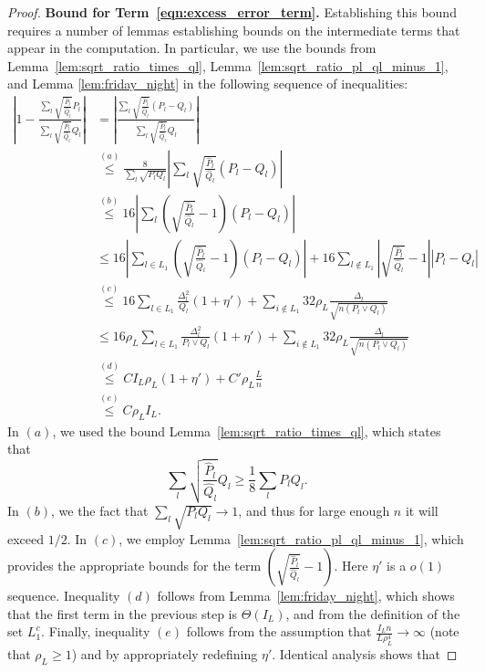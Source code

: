 \documentclass{article}
\begin{document}
\begin{proof}
\noindent \textbf{Bound for Term~\ref{eqn:excess_error_term}.} 
Establishing this bound requires a number of lemmas establishing bounds on the intermediate terms that appear in the computation. In particular, we use the bounds from Lemma~\ref{lem:sqrt_ratio_times_ql}, Lemma~\ref{lem:sqrt_ratio_pl_ql_minus_1}, and Lemma \ref{lem:friday_night} in the following sequence of inequalities:
\begin{align*}
\left| 1 -  \frac{\sum_l \sqrt{\frac{\hat{P}_l}{\hat{Q}_l} } P_l}
                {\sum_l \sqrt{\frac{\hat{P}_l}{\hat{Q}_l} } Q_l}  \right|
 &= \left| \frac{ \sum_l \sqrt{ \frac{\hat{P}_l}{\hat{Q}_l}} (P_l - Q_l) }
     { \sum_l \sqrt{ \frac{\hat{P}_l}{\hat{Q}_l}} Q_l } \right| \\
&\stackrel{(a)}\leq \frac{8}{\sum_l \sqrt{P_l Q_l}} 
     \left| \sum_l \sqrt{ \frac{\hat{P}_l}{\hat{Q}_l} }(P_l - Q_l) \right| \\
&\stackrel{(b)}\leq 16 \left|  \sum_{l} \left( \sqrt{ \frac{\hat{P}_l}{\hat{Q}_l} } - 1 \right) (P_l - Q_l)  \right| \\
&\leq 16 \left| 
     \sum_{l \in L_1} \left( \sqrt{\frac{\hat{P}_l}{\hat{Q}_l}} - 1 \right)(P_l - Q_l) 
     \right| + 16 \sum_{l \notin L_1} \left| \sqrt{ \frac{\hat{P}_l}{\hat{Q}_l}} - 1 \right| |P_l - Q_l| \\
&\stackrel{(c)}\leq 16 \sum_{l \in L_1} \frac{\Delta^2_l}{Q_l}(1+ \eta') + 
      \sum_{i \notin L_1} 32 \rho_L \frac{\Delta_l}{\sqrt{n (P_l \vee Q_l)}} \\
%
&\leq 16 \rho_L \sum_{l \in L_1} \frac{\Delta^2_l}{P_l \vee Q_l} (1+ \eta') + 
      \sum_{i \notin L_1} 32 \rho_L \frac{\Delta_l}{\sqrt{n (P_l \vee Q_l)}} \\
&\stackrel{(d)}\leq C I_L  \rho_L(1 + \eta') + C' \rho_L \frac{L}{n} \\
&\stackrel{(e)} \leq C \rho_L I_L. 
\end{align*}
In $(a)$, we used the bound Lemma~\ref{lem:sqrt_ratio_times_ql}, which states that
$$\sum_l \sqrt{\frac{\hat{P}_l}{\hat{Q}_l} } Q_l \geq \frac{1}{8} \sum_l P_lQ_l.$$ 
In $(b)$, we the fact that $\sum_l  \sqrt{P_l Q_l}  \to 1$, and thus for large enough $n$ it will exceed $1/2$. In $(c)$, we employ Lemma~\ref{lem:sqrt_ratio_pl_ql_minus_1}, which provides the appropriate bounds for the term $\left( \sqrt{\frac{\hat{P}_l}{\hat{Q}_l}} - 1 \right)$. Here $\eta'$ is a $o(1)$ sequence. Inequality $(d)$ follows from Lemma~\ref{lem:friday_night}, which shows that the first term in the previous step is $\Theta(I_L)$, and from the definition of the set $L_1^c$. Finally, inequality $(e)$ follows from the assumption that $\frac{I_L n}{L \rho_L^4} \rightarrow \infty$ (note that $\rho_L \geq 1$) and by appropriately redefining $\eta'$. Identical analysis shows that

\end{proof}
\end{document}
